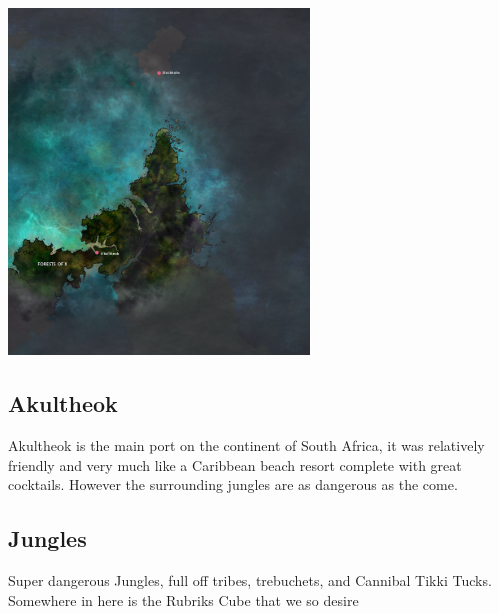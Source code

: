 \vspace{5mm}

\begin{center}
\includegraphics[width=80mm]{./content/img/southAfrica.png}
\begin{figure}[h]
\end{figure}
\end{center}

\noindent 

\subsection*{Akultheok} 

Akultheok is the main port on the continent of South Africa, it was relatively friendly and very much like a Caribbean beach resort complete with great cocktails. However the surrounding jungles are as dangerous as the come. 

\smallskip

\subsection*{Jungles} 

Super dangerous Jungles, full off tribes, trebuchets, and Cannibal Tikki Tucks. Somewhere in here is the Rubriks Cube that we so desire

\smallskip


\bigskip


\clearpage